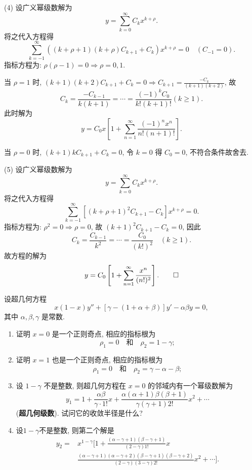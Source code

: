 \begin{solve}
  (4) 设广义幂级数解为
  \[y=\sum_{k=0}^{\infty}C_kx^{k+\rho}.\]
  将之代入方程得
  \[\sum_{k=-1}^{\infty}((k+\rho+1)(k+\rho)C_{k+1}+C_k)x^{k+\rho}=0\quad (C_{-1}=0).\]
  指标方程为: $\rho(\rho-1)=0\Rightarrow\rho=0,1$.

  当 $\rho=1$ 时, $(k+1)(k+2)C_{k+1}+C_k=0\Rightarrow C_{k+1}=\frac{-C_k}{(k+1)(k+2)}$, 故
  \[C_k=\frac{-C_{k-1}}{k(k+1)}=\cdots=\frac{(-1)^kC_0}{k!(k+1)!}(k\geq1).\]
  此时解为
  \[y=C_0x\left[1+\sum_{n=1}^{\infty}\frac{(-1)^nx^n}{n!(n+1)!}\right].\]

  当 $\rho=0$ 时, $(k+1)kC_{k+1}+C_k=0$, 令 $k=0$ 得 $C_0=0$, 不符合条件故舍去.

  (5) 设广义幂级数解为
  \[y=\sum_{k=0}^{\infty}C_kx^{k+\rho}.\]
  将之代入方程得
  \[\sum_{k=-1}^{\infty}\left[(k+\rho+1)^2C_{k+1}-C_k\right]x^{k+\rho}=0.\]
  指标方程为: $\rho^2=0\Rightarrow\rho=0$, 故 $(k+1)^2C_{k+1}-C_k=0$, 因此
  \[C_k=\frac{C_{k-1}}{k^2}=\cdots=\frac{C_0}{(k!)^2}\quad (k\geq 1).\]
  故方程的解为
  \[y=C_0\left[1+\sum_{n=1}^{\infty}\frac{x^n}{(n!)^2}\right].\qedhere\]
\end{solve}



\begin{exercise}
  设超几何方程
  \[x(1-x)y''+[\gamma-(1+\alpha+\beta)]y'-\alpha\beta y=0,\]
  其中 $\alpha,\beta,\gamma$ 是常数.
  \begin{enumerate}[(1)]
    \item 证明 $x=0$ 是一个正则奇点, 相应的指标根为
      \[\rho_1=0\quad\text{和}\quad\rho_2=1-\gamma;\]
    \item 证明 $x=1$ 也是一个正则奇点, 相应的指标根为
      \[\rho_1=0\quad\text{和}\quad\rho_2=\gamma-\alpha-\beta;\]
    \item 设 $1-\gamma$ 不是整数, 则超几何方程在 $x=0$ 的邻域内有一个幂级数解为
      \[y_1=1+\frac{\alpha\beta}{\gamma\cdot1!}x+\frac{\alpha(\alpha+1)\beta(\beta+1)}{\gamma(\gamma+1)2!}x^2+\cdots\]
      (\textbf{超几何级数}). 试问它的收敛半径是什么?
    \item 设$1-\gamma$不是整数, 则第二个解是
      \[\begin{split}
      y_2=&x^{1-\gamma}\bigg[1+\frac{(\alpha-\gamma+1)(\beta-\gamma+1)}{(2-\gamma)1!}x\\
      &\frac{(\alpha-\gamma+1)(\alpha-\gamma+2)(\beta-\gamma+1)(\beta-\gamma+2)}{(2-\gamma)(3-\gamma)2!}x^2+\cdots\bigg].
      \end{split}\]
  \end{enumerate}
\end{exercise}

